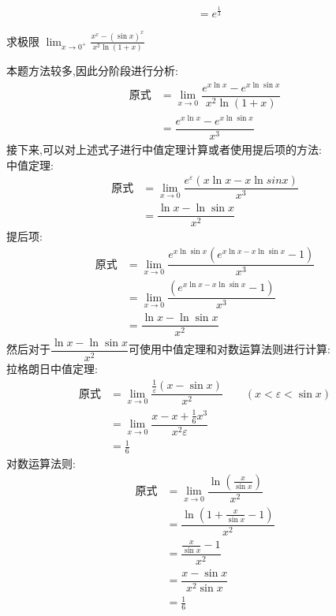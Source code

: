 \documentclass[8pt a4paper, oneside, UTF8]{ctexbook}
\begin{document}
\begin{sloppypar}
\begin{solution}
\begin{align*}
              & = e^{\frac{1}{3}}
            \end{align*}
    \end{solution}
    \begin{problem}
        求极限 $\lim_{x\to0^+}\frac{x^x-(\sin x)^x}{x^2\ln(1+x)}$
    \end{problem}
    \begin{solution}
        本题方法较多,因此分阶段进行分析:
        \begin{align*}
          \text{原式} & =\lim_{x\to0} \dfrac{e^{x \ln x}-e^{x \ln \sin x} }{x^2\ln(1+x)}\\
          & = \dfrac{e^{x \ln x}-e^{x \ln \sin x}}{x^3}
        \end{align*}
    接下来,可以对上述式子进行中值定理计算或者使用提后项的方法:\\
    中值定理:
    \begin{align*}
      \text{原式} & =\lim_{x\to0} \dfrac{e^{\varepsilon}(x\ln x- x\ln sin x)}{x^3}   \\
      & =  \dfrac{\ln x -\ln \sin x}{x^2}
    \end{align*}
    提后项:
    \begin{align*}
      \text{原式} & =\lim_{x\to0} \dfrac{e^{x\ln \sin x}(e^{x\ln x-x \ln \sin x}-1)}{x^3} \\
      & =   \lim_{x\to0} \dfrac{(e^{x\ln x-x \ln \sin x}-1)}{x^3}\\
      & =  \dfrac{\ln x -\ln \sin x}{x^2}
    \end{align*}
    然后对于$\dfrac{\ln x -\ln \sin x}{x^2}$可使用中值定理和对数运算法则进行计算:\\
    拉格朗日中值定理:
    \begin{align*}
      \text{原式} & = \lim_{x \to 0}\dfrac{\frac{1}{\varepsilon}(x-\sin x)}{x^2} \qquad(x<\varepsilon < \sin x) \\
      & =\lim_{x \to 0} \dfrac{x-x+\frac{1}{6}x^3}{x^2 \varepsilon}\\ 
      & = \frac{1}{6}
    \end{align*}
    对数运算法则:
    \begin{align*}
      \text{原式} & =\lim_{x \to 0} \dfrac{\ln (\frac{x}{\sin x})}{x^2}\\
      & =  \dfrac{\ln(1+\frac{x}{\sin x}-1)}{x^2}\\
      & = \dfrac{\frac{x}{\sin x}-1}{x^2}\\
      & = \dfrac{x-\sin x}{x^2\sin x}\\
      &= \frac{1}{6}
    \end{align*}

\end{solution}
\end{sloppypar}
\end{document}
